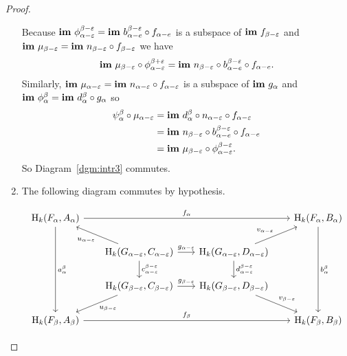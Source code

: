\begin{proof}
\begin{enumerate}[label=\Roman*.]
    Because $\mathbf{im}~\phi_{\alpha-\varepsilon}^{\beta-\varepsilon} = \mathbf{im}~b_{\alpha-e}^{\beta-\varepsilon}\circ f_{\alpha-e}$ is a subspace of $\mathbf{im}~f_{\beta -\varepsilon}$ and $\mathbf{im}~\mu_{\beta -\varepsilon} = \mathbf{im}~n_{\beta -\varepsilon}\circ f_{\beta-\varepsilon}$ we have
    \[ \mathbf{im}~\mu_{\beta-\varepsilon}\circ\phi_{\alpha-\varepsilon}^{\beta +\varepsilon} = \mathbf{im}~n_{\beta -\varepsilon}\circ b_{\alpha-e}^{\beta-\varepsilon}\circ f_{\alpha-e}.\]
    Similarly, $\mathbf{im}~\mu_{\alpha-\varepsilon} = \mathbf{im}~n_{\alpha-\varepsilon}\circ f_{\alpha-\varepsilon}$ is a subspace of $\mathbf{im}~g_\alpha$ and $\mathbf{im}~\phi_\alpha^\beta = \mathbf{im}~d_\alpha^\beta\circ g_\alpha$ so
    \begin{align*}
      \psi_\alpha^\beta \circ\mu_{\alpha-\varepsilon} &= \mathbf{im}~d_\alpha^\beta\circ n_{\alpha-\varepsilon}\circ f_{\alpha-\varepsilon} \\
        &=\mathbf{im}~n_{\beta -\varepsilon}\circ b_{\alpha-e}^{\beta-\varepsilon}\circ f_{\alpha-e}\\
        &=\mathbf{im}~\mu_{\beta -\varepsilon}\circ \phi_{\alpha-\varepsilon}^{\beta -\varepsilon}.
    \end{align*}
    So Diagram~\ref{dgm:intr3} commutes.

    \item The following diagram commutes by hypothesis.

    \begin{equation}\label{dgm:intr1a}\begin{tikzcd}[column sep=scriptsize]
      \hom_k(F_{\alpha}, A_{\alpha})  \arrow[to=Ba, "f_{\alpha}"]
                                      \arrow[from=Ca, "u_{\alpha-\e}"]
                                      \arrow[to=Ab, "a_{\alpha}^{\beta}"]
      & & & |[alias=Ba]|
        \hom_k(F_{\alpha}, B_{\alpha})  \arrow[from=Da, "v_{\alpha -\e}"]
                                        \arrow[to=Bb, "b_{\alpha}^{\beta}"] \\
      & |[alias=Ca]|
      \hom_k(G_{\alpha-\e}, C_{\alpha-\e})  \arrow[to=Da, "g_{\alpha-\e}"]
                                            \arrow[to=Cb, "c_{\alpha-\e}^{\beta-\e}"]
      & |[alias=Da]|
        \hom_k(G_{\alpha-\e}, D_{\alpha-\e})  \arrow[to=Db, "d_{\alpha-\e}^{\beta-\e}"] & \\
      & |[alias=Cb]|
      \hom_k(G_{\beta-\e}, C_{\beta-\e})  \arrow[to=Ab, "u_{\beta-\e}"]
                                \arrow[to=Db, "g_{\beta-\e}"]
      & |[alias=Db]|
        \hom_k(G_{\beta-\e}, D_{\beta-\e})  \arrow[to=Bb, "v_{\beta-\e}"] & \\
      |[alias=Ab]|
      \hom_k(F_{\beta}, A_{\beta}) \arrow[to=Bb, "f_{\beta}"]
      & & & |[alias=Bb]|
        \hom_k(F_{\beta}, B_{\beta})
    \end{tikzcd}\end{equation}


\end{enumerate}
\end{proof}
